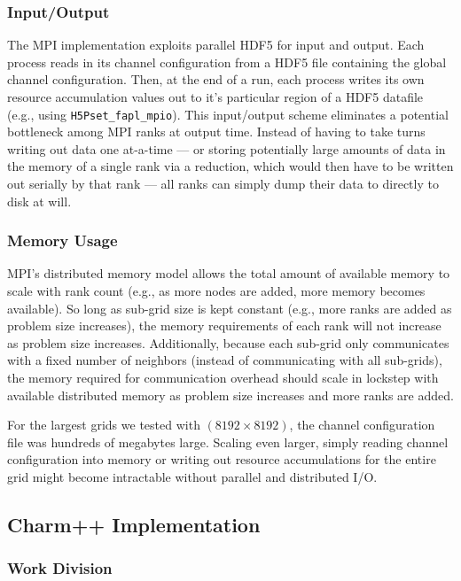 \subsubsection{Input/Output}

The MPI implementation exploits parallel HDF5 for input and output.
Each process reads in its channel configuration from a HDF5 file containing the global channel configuration.
Then, at the end of a run, each process writes its own resource accumulation values out to it's particular region of a HDF5 datafile (e.g., using \texttt{H5Pset_fapl_mpio}).
This input/output scheme eliminates a potential bottleneck among MPI ranks at output time.
Instead of having to take turns writing out data one at-a-time --- or storing potentially large amounts of data in the memory of a single rank via a reduction, which would then have to be written out serially by that rank --- all ranks can simply dump their data to directly to disk at will.

\subsubsection{Memory Usage}

MPI's distributed memory model allows the total amount of available memory to scale with rank count (e.g., as more nodes are added, more memory becomes available).
So long as sub-grid size is kept constant (e.g., more ranks are added as problem size increases), the memory requirements of each rank will not increase as problem size increases.
Additionally, because each sub-grid only communicates with a fixed number of neighbors (instead of communicating with all sub-grids), the memory required for communication overhead should scale in lockstep with available distributed memory as problem size increases and more ranks are added.

For the largest grids we tested with $(8192 \times 8192)$, the channel configuration file was hundreds of megabytes large.
Scaling even larger, simply reading channel configuration into memory or writing out resource accumulations for the entire grid might become intractable without parallel and distributed I/O.

\subsection{Charm++ Implementation}

\subsubsection{Work Division}

